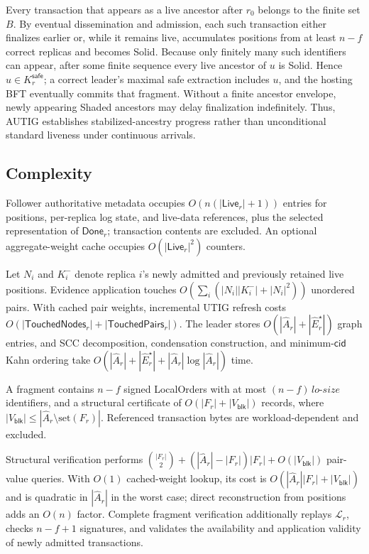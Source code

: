 Every transaction that appears as a live ancestor after $r_0$ belongs to the finite set $B$. By eventual dissemination and admission, each such transaction either
finalizes earlier or, while it remains live, accumulates positions from at least $n-f$ correct replicas and becomes Solid. Because only finitely many such identifiers can appear, after some finite sequence every live ancestor of $u$ is Solid. Hence $u\in K_r^{\mathsf{safe}}$; a correct leader's maximal safe extraction includes $u$, and the hosting BFT eventually commits that fragment.
Without a finite ancestor envelope, newly appearing Shaded ancestors may delay finalization indefinitely. Thus, AUTIG establishes stabilized-ancestry progress rather than
unconditional standard liveness under continuous arrivals.

\subsection{Complexity}
\label{sec:complexity}

Follower authoritative metadata occupies
$O(n(|\mathsf{Live}_r|+1))$ entries for positions, per-replica log state, and live-data references, plus the selected representation of $\mathsf{Done}_r$; transaction contents are excluded. An optional aggregate-weight cache occupies $O(|\mathsf{Live}_r|^2)$ counters.

Let $N_i$ and $K_i^-$ denote replica $i$'s newly admitted and previously retained live positions.
Evidence application touches $O(\sum_i(|N_i||K_i^-|+|N_i|^2))$ unordered pairs. With cached pair weights, incremental UTIG refresh costs $O(|\mathsf{TouchedNodes}_r|+|\mathsf{TouchedPairs}_r|)$.
The leader stores $O(|\widehat A_r|+|\widehat E_r^\star|)$ graph entries, and SCC decomposition, condensation construction, and minimum-$\mathsf{cid}$ Kahn ordering take
$O(|\widehat A_r|+|\widehat E_r^\star|
  +|\widehat A_r|\log|\widehat A_r|)$ time.

A fragment contains $n-f$ signed LocalOrders with at most
$(n-f)\,lo\text{-}size$ identifiers, and a structural certificate of $O(|F_r|+|V_{\mathsf{blk}}|)$ records, where
$|V_{\mathsf{blk}}|  \le|\widehat A_r\setminus\mathrm{set}(F_r)|$. Referenced transaction bytes are workload-dependent and excluded.

Structural verification performs
$\binom{|F_r|}{2}
 +( |\widehat A_r|-|F_r| )|F_r|
 +O(|V_{\mathsf{blk}}|)$
pair-value queries.
With $O(1)$ cached-weight lookup, its cost is
$O(|\widehat A_r||F_r|+|V_{\mathsf{blk}}|)$ and is quadratic in $|\widehat A_r|$ in the worst case; direct reconstruction from positions adds an $O(n)$ factor.
Complete fragment verification additionally replays $\mathcal L_r$, checks $n-f+1$ signatures, and validates the availability and application validity of newly admitted transactions.


